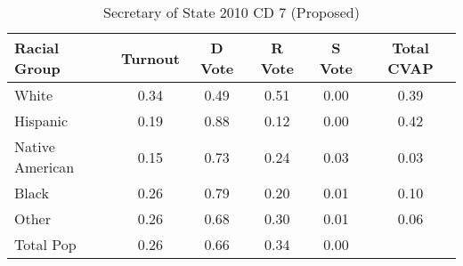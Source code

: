 \begin{table}[htb]
\begin{center}
\caption{Secretary of State 2010 CD 7 (Proposed)}
\label{sos10_cvap_cd_7}
\begin{tabular}{lccccc}
  \hline
Racial Group & Turnout & D Vote & R Vote & S Vote & Total CVAP \\ 
  \hline
White & 0.34 & 0.49 & 0.51 & 0.00 & 0.39 \\ 
  Hispanic & 0.19 & 0.88 & 0.12 & 0.00 & 0.42 \\ 
  Native American & 0.15 & 0.73 & 0.24 & 0.03 & 0.03 \\ 
  Black & 0.26 & 0.79 & 0.20 & 0.01 & 0.10 \\ 
  Other & 0.26 & 0.68 & 0.30 & 0.01 & 0.06 \\ 
  Total Pop & 0.26 & 0.66 & 0.34 & 0.00 &  \\ 
   \hline
\end{tabular}
\end{center}
\end{table}
